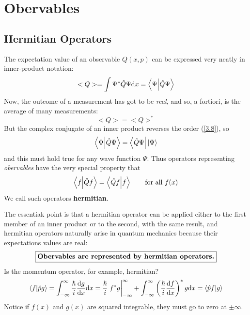 \section{Obervables}
\subsection{Hermitian Operators}
The expectation value of an observable $Q(x,p)$ can be expressed very neatly in inner-product notation:
\begin{equation}\label{3.13}
	<Q>=\int \Psi^*\hat{Q}\Psi\dd x=\bra{\Psi}\ket{\hat{Q}\Psi}
\end{equation}
Now, the outcome of a measurement has got to be \textit{real}, and so, a fortiori, is the average of many measurements:
\begin{equation}\label{3.14}
	<Q>=<Q>^*
\end{equation}
But the complex conjugate of an inner product reverses the order (\ref{3.8}), so
\begin{equation}\label{3.15}
	\bra{\Psi}\ket{\hat{Q}\Psi}=\bra{\hat{Q}\Psi}{\ket\Psi}
\end{equation}
and this must hold true for any wave function $\Psi$. Thus operators representing \textit{obervables} have the very special property that
\begin{equation}\label{3.16}
	\bra{f}\ket{\hat{Q}f}=\bra{\hat{Q}f}\ket{f}\qquad\mbox{for all $f(x)$}
\end{equation}
We call such operators \textbf{hermitian}.

The essentiak point is that a hermitian operator can be applied either to the first member of an inner product or to the second, with the same result, and hermitian operators naturally arise in quantum mechanics because their expectations values are real:
\begin{equation}\label{3.18}
	\boxed{\mbox{\textbf{Obervables are represented by hermitian operators.}}}
\end{equation}
Is the momentum operator, for example, hermitian?
\begin{equation}\label{3.19}
	\bra{f}\ket{\hat{p}g}=\int_{-\infty}^\infty \frac{\hbar}{i}\dv{g}{x}\dd x=\frac{\hbar}{i}\eval{f^*g}_{-\infty}^\infty +\int_{-\infty}^\infty \left(\frac{\hbar}{i}\dv{f}{x}\right)^*g\dd x=\bra{\hat{p}f}\ket{g}
\end{equation}
Notice if $f(x)$ and $g(x)$ are squared integrable, they must go to zero at $\pm\infty$.

